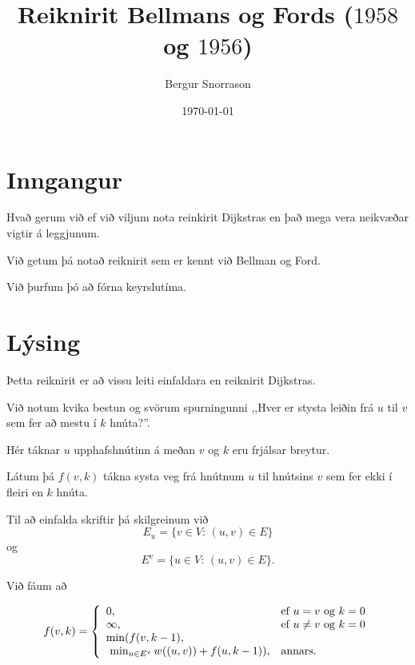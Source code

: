 \title{Reiknirit Bellmans og Fords ($1958$ og $1956$)}
\author{Bergur Snorrason}
\date{\today}



\frame{\titlepage}

\section{Inngangur}
{
    {
        \item<1-> Hvað gerum við ef við viljum nota reinkirit Dijkstras en það mega vera neikvæðar vigtir á leggjunum.
            \item<2-> Við getum þá notað reiknirit sem er kennt við Bellman og Ford.
            \item<3-> Við þurfum þó að fórna keyrslutíma.
    }
}

\section{Lýsing}
{
    {
        \item<1-> Þetta reiknirit er að vissu leiti einfaldara en reiknirit Dijkstras.
            \item<2-> Við notum kvika bestun og svörum spurningunni ,,Hver er stysta leiðin frá $u$ til $v$ sem fer að mestu í $k$ hnúta?''.
            \item<3-> Hér táknar $u$ upphafshnútinn á meðan $v$ og $k$ eru frjálsar breytur.
            \item<4-> Látum þá $f(v, k)$ tákna systa veg frá hnútnum $u$ til hnútsins $v$ sem fer ekki í fleiri en $k$ hnúta.
            \item<5-> Til að einfalda skriftir þá skilgreinum við
            \[
            E_u = \{v \in V:\, (u, v) \in E\}
        \]
            og
            \[
            E^v = \{u \in V:\, (u, v) \in E\}.
                \]
                \item<6-> Við fáum að
    }
    {
        \[
            f(v, k) = \left \{
            \env{array}
            { {l l}
                0, & \text{ef $u = v$ og $k = 0$}\\
                \infty, & \text{ef $u \neq v$ og $k = 0$}\\
                \min(f(v, k - 1), & \\
                        \ \min_{u \in E^v} w((u, v)) + f(u, k - 1)), & \text{annars.}
            }
            \right .
        \]
    }
}

